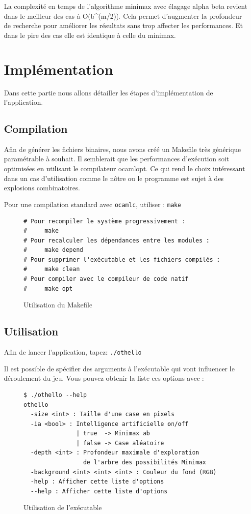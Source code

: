 \documentclass[11pt]{article}
\begin{document}
La complexité en temps de l'algorithme minimax avec élagage alpha beta
revient dans le meilleur des cas à O(b\^{}(m/2)). Cela permet d'augmenter
la profondeur de recherche pour améliorer les résultats sans trop
affecter les performances. Et dans le pire des cas elle est identique à
celle du minimax.


\section{Implémentation}

Dans cette partie nous allons détailler les étapes d'implémentation de l'application. 

\subsection{Compilation}

Afin de générer les fichiers binaires, nous avons créé un Makefile très générique paramétrable à souhait. Il semblerait que les performances d'exécution soit optimisées en utilisant le compilateur ocamlopt. Ce qui rend le choix intéressant  dans un cas d'utilisation comme le nôtre ou le programme est sujet à des explosions combinatoires. 

Pour une compilation standard avec \texttt{ocamlc}, utiliser : \texttt{make}

\begin{figure}[H]
\caption{Utilisation du Makefile}
\begin{verbatim}
# Pour recompiler le système progressivement :
#     make
# Pour recalculer les dépendances entre les modules :
#     make depend
# Pour supprimer l'exécutable et les fichiers compilés :
#     make clean
# Pour compiler avec le compileur de code natif
#     make opt
\end{verbatim}
\end{figure}

\subsection{Utilisation}

Afin de lancer l'application, tapez: \texttt{./othello}

Il est possible de spécifier des arguments à l'exécutable qui vont influencer le déroulement du jeu. Vous pouvez obtenir la liste ces options avec :

\begin{figure}[H]
\caption{Utilisation de l'exécutable}
\begin{verbatim}
$ ./othello --help
othello
  -size <int> : Taille d'une case en pixels
  -ia <bool> : Intelligence artificielle on/off
               | true  -> Minimax ab 
               | false -> Case aléatoire
  -depth <int> : Profondeur maximale d'exploration 
                 de l'arbre des possibilités Minimax 
  -background <int> <int> <int> : Couleur du fond (RGB)
  -help : Afficher cette liste d'options
  --help : Afficher cette liste d'options
\end{verbatim}
\end{figure}
\end{document}
